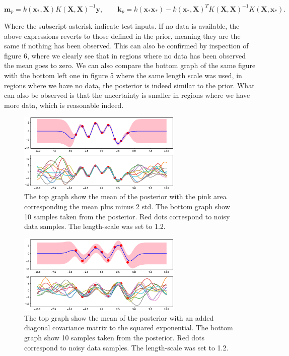 \documentclass[a4paper]{article}
\begin{document}
\begin{equation*}
\mathbf{m}_p=k(\mathbf{x}_*,\mathbf{X})K(\mathbf{X,X})^{-1}\mathbf{y},\qquad \mathbf{k}_p = k(\mathbf{x}_*\mathbf{x}_*)-k(\mathbf{x}_*,\mathbf{X})^TK(\mathbf{X,X})^{-1}K(\mathbf{X},\mathbf{x}_*).
\end{equation*} 

\noindent Where the subscript asterisk indicate test inputs. If no data is available, the above expressions reverts to those defined in the prior, meaning they are the same if nothing has been observed. This can also be confirmed by inspection of figure 6, where we clearly see that in regions where no data has been observed the mean goes to zero. We can also compare the bottom graph of the same figure with the bottom left one in figure 5 where the same length scale was used, in regions where we have no data, the posterior is indeed similar to the prior. What can also be observed is that the uncertainty is smaller in regions where we have more data, which is reasonable indeed.

\begin{figure}[H]
	\centering
	\includegraphics[width=0.7\textwidth]{GPosterior.eps}
	\caption{\label{fig:frog} The top graph show the mean of the posterior with the pink area corresponding the mean plus minus 2 std. The bottom graph show 10 samples taken from the posterior. Red dots correspond to noisy data samples. The length-scale was set to 1.2.}
\end{figure}

\begin{figure}[H]
	\centering
	\includegraphics[width=0.7\textwidth]{GNoisePosterior.eps}
	\caption{\label{fig:frog} The top graph show the mean of the posterior with an added diagonal covariance matrix to the squared exponential. The bottom graph show 10 samples taken from the posterior. Red dots correspond to noisy data samples. The length-scale was set to 1.2.}
\end{figure}
\end{document}
